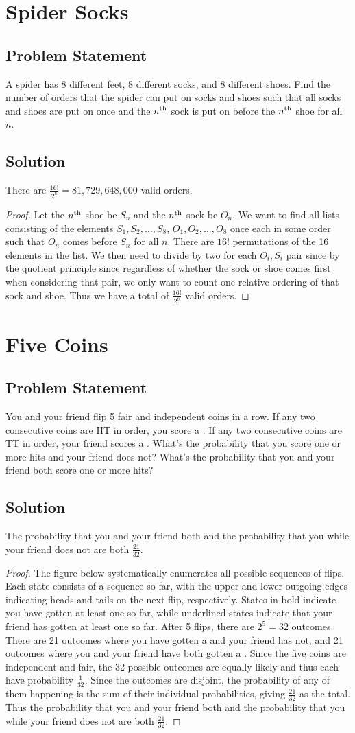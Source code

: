 \documentclass[12pt]{article}
\newcommand{\ts}[1]{\textsuperscript{#1}}
\newcommand{\ProblemStatement}[1]{
\subsection*{Problem Statement}
#1
\subsection*{Solution}
}
\begin{document}
\section{Spider Socks}
\ProblemStatement{
A spider has 8 different feet, 8 different socks, and 8 different shoes. Find the number of orders that the spider can put on socks and shoes such that all socks and shoes are put on once and the $n\ts{th}$ sock is put on before the $n\ts{th}$ shoe for all $n$.}
There are $\frac{16!}{2^8} = 81,729,648,000$ valid orders. 

\begin{proof}
Let the $n\ts{th}$ shoe be $S_n$ and the $n\ts{th}$ sock be $O_n$. We want to find all lists consisting of the elements $S_1, S_2, \dots, S_8$, $O_1, O_2, \dots, O_8$ once each in some order such that $O_n$ comes before $S_n$ for all $n$. There are $16!$ permutations of the 16 elements in the list. We then need to divide by two for each $O_i, S_i$ pair since by the quotient principle since regardless of whether the sock or shoe comes first when considering that pair, we only want to count one relative ordering of that sock and shoe. Thus we have a total of $\frac{16!}{2^8}$ valid orders.
\end{proof}


\section{Five Coins}
\ProblemStatement{
You and your friend flip 5 fair and independent coins in a row. If any two consecutive coins are HT in order, you score a \say{hit}. If any two consecutive coins are TT in order, your friend scores a \say{hit}. What's the probability that you score one or more hits and your friend does not? What's the probability that you and your friend both score one or more hits?
}

The probability that you and your friend both  and the probability that you  while your friend does not are both $\frac{21}{32}$.

\begin{proof}
The figure below systematically enumerates all possible sequences of flips. Each state consists of a sequence so far, with the upper and lower outgoing edges indicating heads and tails on the next flip, respectively. States in bold indicate you have gotten at least one  so far, while underlined states indicate that your friend has gotten at least one  so far. After 5 flips, there are $2^5 = 32$ outcomes. There are 21 outcomes where you have gotten a  and your friend has not, and 21 outcomes where you and your friend have both gotten a . Since the five coins are independent and fair, the 32 possible outcomes are equally likely and thus each have probability $\frac{1}{32}$. Since the outcomes are disjoint, the probability of any of them happening is the sum of their individual probabilities, giving $\frac{21}{32}$ as the total. Thus the probability that you and your friend both  and the probability that you  while your friend does not are both $\frac{21}{32}$.
\end{proof}
\end{document}
